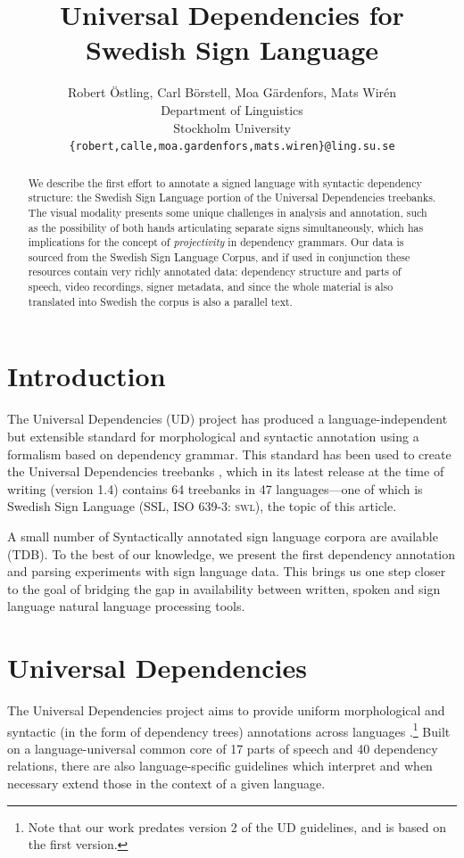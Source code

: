 \documentclass[11pt]{article}
\title{Universal Dependencies for Swedish Sign Language}
\author{Robert {\"O}stling, Carl B{\"o}rstell,
    Moa G{\"a}rdenfors, Mats Wir{\'e}n \\
  Department of Linguistics \\
  Stockholm University \\
  {\tt \{robert,calle,moa.gardenfors,mats.wiren\}@ling.su.se} \\}
\date{}
\begin{document}
\maketitle
\begin{abstract}
    We describe the first effort to annotate a signed language with syntactic
    dependency structure: the Swedish Sign Language portion of the
    Universal Dependencies treebanks.
    The visual modality presents some unique challenges in analysis and
    annotation, such as the possibility of
    both hands articulating separate signs simultaneously, which has
    implications for the concept of \emph{projectivity} in dependency grammars.
    Our data is sourced from the Swedish Sign Language Corpus,
    and if used in conjunction these resources contain very richly
    annotated data: dependency structure and parts of speech,
    video recordings, signer metadata, and since the whole material is
    also translated into Swedish the corpus is also a parallel text.
\end{abstract}

\section{Introduction}

The Universal Dependencies (UD) project \cite{Nivre2016ud} 
has produced a language-independent but extensible standard for
morphological and syntactic annotation using a formalism based on
dependency grammar. This standard has been used to create the Universal
Dependencies treebanks \cite{ud14}, which in its latest release at the time of
writing (version 1.4) contains 64 treebanks in 47 languages---one of which is
Swedish Sign Language (SSL, ISO 639-3: \textsc{swl}), the topic of this
article.

A small number of Syntactically annotated sign language corpora are available
(TDB).
To the best of our knowledge, we present the first dependency annotation and
parsing experiments with sign language data. This brings us one step closer to
the goal of bridging the gap in availability between written, spoken and sign
language natural language processing tools.

\section{Universal Dependencies}

The Universal Dependencies project aims to provide uniform morphological and
syntactic (in the form of dependency trees) annotations across languages
\cite{Nivre2016ud}.\footnote{Note that our work predates version 2 of the UD
guidelines, and is based on the first version.}
Built on a language-universal common core of 17 parts of speech and
40 dependency relations, there are also language-specific guidelines which
interpret and when necessary extend those in the context of a given language.
\end{document}
